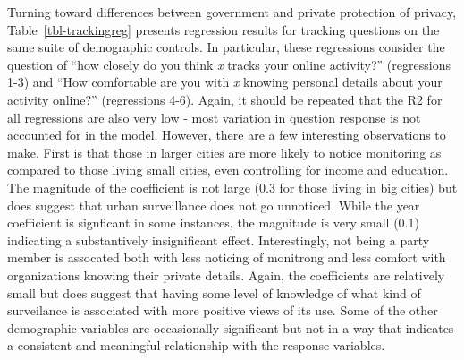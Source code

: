 \documentclass[
  letterpaper,
  DIV=11,
  numbers=noendperiod]{scrartcl}
\begin{document}
Turning toward differences between government and private protection of
privacy, Table~\ref{tbl-trackingreg} presents regression results for
tracking questions on the same suite of demographic controls. In
particular, these regressions consider the question of ``how closely do
you think \emph{x} tracks your online activity?'' (regressions 1-3) and
``How comfortable are you with \emph{x} knowing personal details about
your activity online?'' (regressions 4-6). Again, it should be repeated
that the R2 for all regressions are also very low - most variation in
question response is not accounted for in the model. However, there are
a few interesting observations to make. First is that those in larger
cities are more likely to notice monitoring as compared to those living
small cities, even controlling for income and education. The magnitude
of the coefficient is not large (0.3 for those living in big cities) but
does suggest that urban surveillance does not go unnoticed. While the
year coefficient is signficant in some instances, the magnitude is very
small (0.1) indicating a substantively insignificant effect.
Interestingly, not being a party member is assocated both with less
noticing of monitrong and less comfort with organizations knowing their
private details. Again, the coefficients are relatively small but does
suggest that having some level of knowledge of what kind of surveilance
is associated with more positive views of its use. Some of the other
demographic variables are occasionally significant but not in a way that
indicates a consistent and meaningful relationship with the response
variables.
\end{document}
